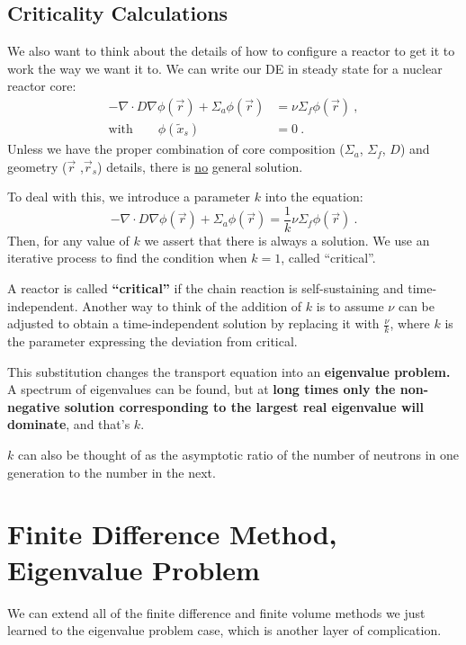 \documentclass[12pt]{article}
\begin{document}
\subsection*{Criticality Calculations}
We also want to think about the details of how to configure a reactor to get it to work the way we want it to. 
We can write our DE in steady state for a nuclear reactor core:
%
\begin{align*}
-\nabla \cdot D\nabla \phi(\vec{r}) + 
\Sigma_a \phi(\vec{r}) &= \nu \Sigma_f \phi(\vec{r})\:, \\
\text{with} \qquad \phi(\tilde{x}_s) &= 0\:.
\end{align*}
%
Unless we have the proper combination of core composition ($\Sigma_a$, $\Sigma_f$, $D$) and geometry ($\vec{r}$ ,$\vec{r}_s$) details, there is \underline{no} general solution. 

To deal with this, we introduce a parameter $k$ into the equation:
%
\begin{equation}
-\nabla \cdot D\nabla \phi(\vec{r}) + 
\Sigma_a \phi(\vec{r}) = \frac{1}{k}\nu \Sigma_f \phi(\vec{r})\:. \nonumber
\end{equation}
%
Then, for any value of $k$ we assert that there is always a solution. We use an iterative process to find the condition when $k=1$, called ``critical''.

A reactor is called \textbf{``critical''} if the chain reaction is self-sustaining and time-independent. Another way to think of the addition of $k$ is to assume $\nu$ can be adjusted to obtain a time-independent solution by replacing it with $\frac{\nu}{k}$, where $k$ is the parameter expressing the deviation from critical. 

This substitution changes the transport equation into an \textbf{eigenvalue problem.} A spectrum of eigenvalues can be found, but at \textbf{long times only the non-negative solution corresponding to the largest real eigenvalue will dominate}, and that's $k$. 

$k$ can also be thought of as the asymptotic ratio of the number of neutrons in one generation to the number in the next.

\section*{Finite Difference Method, Eigenvalue Problem}

We can extend all of the finite difference and finite volume methods we just learned to the eigenvalue problem case, which is another layer of complication. 
\end{document}
